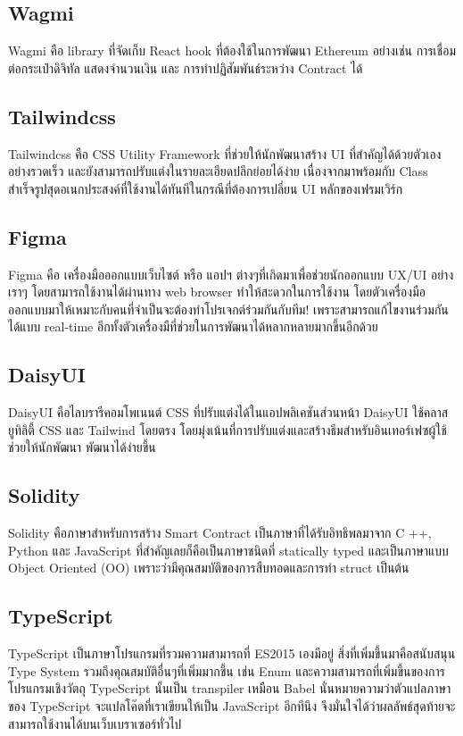 \documentclass[12pt,oneside,openright,a4paper]{cpe-thai-project}
\begin{document}
\subsection{Wagmi \cite{wagmi}}
\tab Wagmi คือ library ที่จัดเก็บ React hook ที่ต้องใช้ในการพัฒนา Ethereum อย่างเช่น การเชื่อมต่อกระเป๋าดิจิทัล แสดงจำนวนเงิน และ การทำปฏิสัมพันธ์ระหว่าง Contract ได้

\subsection{Tailwindcss \cite{tailwind}}
\tab Tailwindcss คือ CSS Utility Framework ที่ช่วยให้นักพัฒนาสร้าง UI ที่สำคัญได้ด้วยตัวเองอย่างรวดเร็ว และยังสามารถปรับแต่งในรายละเอียดปลีกย่อยได้ง่าย เนื่องจากมาพร้อมกับ Class สำเร็จรูปสุดอเนกประสงค์ที่ใช้งานได้ทันทีในกรณีที่ต้องการเปลี่ยน UI หลักของเฟรมเวิร์ก

\subsection{Figma \cite{figma}}
\tab Figma คือ เครื่องมือออกแบบเว็บไซต์ หรือ แอปฯ ต่างๆที่เกิดมาเพื่อช่วยนักออกแบบ UX/UI อย่างเราๆ โดยสามารถใช้งานได้ผ่านทาง web browser ทำให้สะดวกในการใช้งาน โดยตัวเครื่องมือออกแบบมาให้เหมาะกับคนที่จำเป็นจะต้องทำโปรเจกต์ร่วมกันกับทีม! เพราะสามารถแก้ไขงานร่วมกันได้แบบ real-time อีกทั้งตัวเครื่องมืที่ช่วยในการพัฒนาได้หลากหลายมากขึ้นอีกด้วย 

\subsection{DaisyUI \cite{daisyUI}}
\tab DaisyUI คือไลบรารีคอมโพเนนต์ CSS ที่ปรับแต่งได้ในแอปพลิเคชันส่วนหน้า DaisyUI ใช้คลาสยูทิลิตี้ CSS และ Tailwind โดยตรง โดยมุ่งเน้นที่การปรับแต่งและสร้างธีมสำหรับอินเทอร์เฟซผู้ใช้ ช่วยให้นักพัฒนา พัฒนาได้ง่ายขึ้น

\subsection{Solidity \cite{solidity}}
\tab Solidity คือภาษาสำหรับการสร้าง Smart Contract เป็นภาษาที่ได้รับอิทธิพลมาจาก C ++, Python และ JavaScript ที่สำคัญเลยก็คือเป็นภาษาชนิดที่ statically typed และเป็นภาษาแบบ Object Oriented (OO) เพราะว่ามีคุณสมบัติของการสืบทอดและการทำ struct เป็นต้น

\subsection{TypeScript \cite{typescript}}
\tab TypeScript เป็นภาษาโปรแกรมที่รวมความสามารถที่ ES2015 เองมีอยู่ สิ่งที่เพิ่มขึ้นมาคือสนับสนุน Type System รวมถึงคุณสมบัติอื่นๆที่เพิ่มมากขึ้น เช่น Enum และความสามารถที่เพิ่มขึ้นของการโปรแกรมเชิงวัตถุ TypeScript นั้นเป็น transpiler เหมือน Babel นั่นหมายความว่าตัวแปลภาษาของ TypeScript จะแปลโค๊ดที่เราเขียนให้เป็น JavaScript อีกทีนึง จึงมั่นใจได้ว่าผลลัพธ์สุดท้ายจะสามารถใช้งานได้บนเว็บเบราเซอร์ทั่วไป
\end{document}
